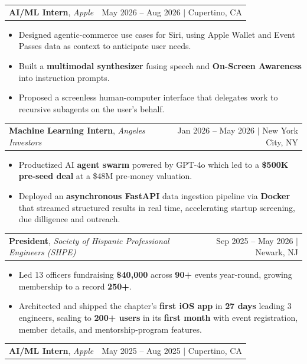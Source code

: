 \documentclass[letterpaper,10pt]{article}
\makeatletter
\newcommand{\resumeItem}[1]{\item\small{{#1}}}
\newcommand{\resumeOneLineHeading}[4]{
  \vspace{1pt}\item
    \begin{tabular*}{0.97\textwidth}[t]{l@{\extracolsep{\fill}}r}
      \textbf{#1}, \textit{#2} & \small #3 $|$ #4 \\
    \end{tabular*}\vspace{-3pt}
}
\newcommand{\resumeItemListStart}{
  \begin{itemize}[leftmargin=0.25in]
}
\newcommand{\resumeItemListEnd}{
  \end{itemize}\vspace{-3pt}
}
\makeatother
\begin{document}
      \vspace{5pt}

    \resumeOneLineHeading
      {AI/ML Intern}
      {Apple}
      {May 2026 -- Aug 2026}
      {Cupertino, CA}

      \vspace{5pt}

      \resumeItemListStart
      \resumeItem{Designed agentic-commerce use cases for Siri, using Apple Wallet and Event Passes data as context to anticipate user needs.}
      \resumeItem{Built a \textbf{multimodal synthesizer} fusing speech and \textbf{On-Screen Awareness} into instruction prompts.}
      \resumeItem{Proposed a screenless human-computer interface that delegates work to recursive subagents on the user's behalf.}
      \resumeItemListEnd


    \resumeOneLineHeading
      {Machine Learning Intern}
      {Angeles Investors}
      {Jan 2026 -- May 2026}
      {New York City, NY}

      \vspace{5pt}


       \resumeItemListStart
        \resumeItem{Productized AI \textbf{agent swarm} powered by GPT-4o which led to a \textbf{\$500K pre-seed deal} at a \$48M pre-money valuation.}
        \resumeItem{Deployed an \textbf{asynchronous FastAPI} data ingestion pipeline via \textbf{Docker} that streamed structured results in real time, accelerating startup screening, due dilligence and outreach.}
      \resumeItemListEnd
  



    \resumeOneLineHeading
      {President}
      {Society of Hispanic Professional Engineers (SHPE)}
      {Sep 2025 -- May 2026 }
      {Newark, NJ}

      \vspace{5pt}

      \resumeItemListStart
        \resumeItem{Led 13 officers fundraising \textbf{\$40,000} across \textbf{90+} events year-round, growing membership to a record \textbf{250+}.}
        \resumeItem{Architected and shipped the chapter's \textbf{first iOS app} in \textbf{27 days} leading 3 engineers, scaling to \textbf{200+ users} in its \textbf{first month} with event registration, member details, and mentorship-program features.}
      \resumeItemListEnd

    \resumeOneLineHeading
      {AI/ML Intern}
      {Apple}
      {May 2025 -- Aug 2025}
      {Cupertino, CA}

      \vspace{5pt}
\end{document}
